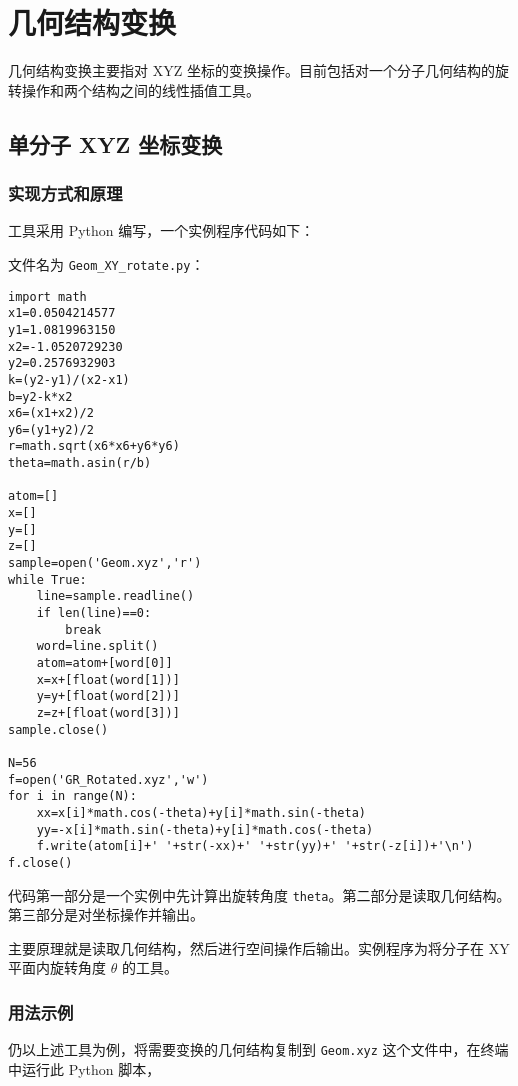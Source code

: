 \documentclass[a4paper,openany]{book}
\begin{document}
\section{几何结构变换}

几何结构变换主要指对 XYZ 坐标的变换操作。目前包括对一个分子几何结构的旋转操作和两个结构之间的线性插值工具。

\subsection{单分子 XYZ 坐标变换}

\subsubsection{实现方式和原理}

工具采用 Python 编写，一个实例程序代码如下：

文件名为 \texttt{Geom\_XY\_rotate.py}：

\begin{shaded}\begin{verbatim}
import math
x1=0.0504214577
y1=1.0819963150
x2=-1.0520729230
y2=0.2576932903
k=(y2-y1)/(x2-x1)
b=y2-k*x2
x6=(x1+x2)/2
y6=(y1+y2)/2
r=math.sqrt(x6*x6+y6*y6)
theta=math.asin(r/b)

atom=[]
x=[]
y=[]
z=[]
sample=open('Geom.xyz','r')
while True:
    line=sample.readline()
    if len(line)==0:
        break
    word=line.split()
    atom=atom+[word[0]]
    x=x+[float(word[1])]
    y=y+[float(word[2])]
    z=z+[float(word[3])]
sample.close()

N=56
f=open('GR_Rotated.xyz','w')
for i in range(N):
    xx=x[i]*math.cos(-theta)+y[i]*math.sin(-theta)
    yy=-x[i]*math.sin(-theta)+y[i]*math.cos(-theta)
    f.write(atom[i]+' '+str(-xx)+' '+str(yy)+' '+str(-z[i])+'\n')
f.close()
\end{verbatim}\end{shaded}

代码第一部分是一个实例中先计算出旋转角度 \texttt{theta}。第二部分是读取几何结构。第三部分是对坐标操作并输出。

主要原理就是读取几何结构，然后进行空间操作后输出。实例程序为将分子在 XY 平面内旋转角度 $\theta$ 的工具。

\subsubsection{用法示例}

仍以上述工具为例，将需要变换的几何结构复制到 \texttt{Geom.xyz} 这个文件中，在终端中运行此 Python 脚本，
\end{document}
